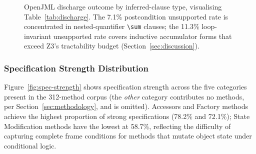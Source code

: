 \begin{figure}[ht]
\centering
{}
\caption{OpenJML discharge outcome by inferred-clause type, visualising Table~\ref{tab:discharge}. The 7.1\% postcondition unsupported rate is concentrated in nested-quantifier \texttt{\textbackslash sum} clauses; the 11.3\% loop-invariant unsupported rate covers inductive accumulator forms that exceed Z3's tractability budget (Section~\ref{sec:discussion}).}
\label{fig:discharge}
\end{figure}

\subsubsection{Specification Strength Distribution}
\label{subsec:strength-results}

Figure~\ref{fig:spec-strength} shows specification strength across the five categories present in the 312-method corpus (the \emph{other} category contributes no methods, per Section~\ref{sec:methodology}, and is omitted). Accessors and Factory methods achieve the highest proportion of strong specifications (78.2\% and 72.1\%); State Modification methods have the lowest at 58.7\%, reflecting the difficulty of capturing complete frame conditions for methods that mutate object state under conditional logic.

